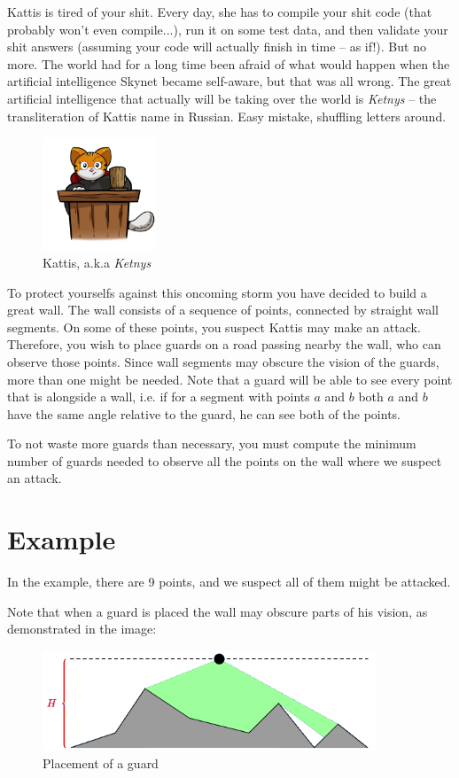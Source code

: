 \newcommand\version{v1}
Kattis is tired of your shit.
Every day, she has to compile your shit code (that probably won't even compile...), run it on some test data, and then validate your shit answers (assuming your code will actually finish in time -- as if!).
But no more.
The world had for a long time been afraid of what would happen when the artificial intelligence Skynet became self-aware, but that was all wrong. The great artificial intelligence that actually will be taking over the world
is \emph{Ketnys} -- the transliteration of Kattis name in Russian. Easy mistake, shuffling letters around.

\begin{figure}[h!]
  \centering
  \includegraphics[width=0.3\textwidth]{kattis.png}
  \caption{Kattis, a.k.a \emph{Ketnys}}
\end{figure}

To protect yourselfs against this oncoming storm you have decided to build a great wall. The wall consists of a sequence of points, connected by straight wall segments.
On some of these points, you suspect Kattis may make an attack. Therefore, you wish to place guards on a road passing nearby the wall, who can observe those points.
Since wall segments may obscure the vision of the guards, more than one might be needed. Note that a guard will be able to see every point that is alongside a wall, i.e. if 
for a segment with points $a$ and $b$ both $a$ and $b$ have the same angle relative to the guard, he can see both of the points.

To not waste more guards than necessary, you must compute the minimum number of guards needed to observe all the points on the wall where we suspect an attack.

\section*{Example}
In the example, there are 9 points, and we suspect all of them might be attacked.

Note that when a guard is placed the wall may obscure parts of his vision, as demonstrated in the image:
\begin{figure}[h!]
  \centering
  \includegraphics[height=3cm]{imw.png}
  \caption{Placement of a guard}
\end{figure}

